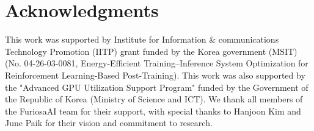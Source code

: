 \section*{Acknowledgments}

This work was supported by Institute for Information \& communications Technology Promotion (IITP) grant funded by the Korea government (MSIT) (No. 04-26-03-0081, Energy-Efficient Training–Inference System Optimization for Reinforcement Learning-Based Post-Training). This work was also supported by the "Advanced GPU Utilization Support Program" funded by the Government of the Republic of Korea (Ministry of Science and ICT). We thank all members of the FuriosaAI team for their support, with special thanks to Hanjoon Kim and June Paik for their vision and commitment to research.